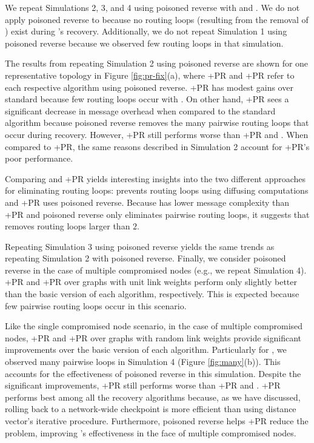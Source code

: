 We repeat Simulations 2, 3, and 4 using poisoned reverse with \second and \cprs.  
We do not apply poisoned reverse to \purge because no routing loops (resulting from the removal of \bads)
exist during \purges's recovery. Additionally, we do not repeat Simulation 1 using poisoned reverse because we observed few routing loops in that simulation. 

The results from repeating Simulation 2 using poisoned reverse are shown for one representative topology in Figure \ref{fig:pr-fix}(a),
where \seconds+{\textsc PR} and \cprs+{\textsc PR} refer to each respective algorithm
using poisoned reverse. 
\cprs+{\textsc PR} has modest gains over standard \cpr because few routing loops occur with \cprs. On other hand,
\seconds+{\textsc PR} sees a significant decrease in message overhead when compared to the standard \second algorithm because poisoned reverse removes the many pairwise routing 
loops that occur during \second recovery. However,  \seconds+{\textsc PR} still performs worse than \cprs+{\textsc PR} and \purges.  When compared to \cprs+{\textsc PR}, 
the same reasons described in Simulation 2 account for \seconds+{\textsc PR}'s poor performance. %

Comparing \purge and \seconds+{\textsc PR} yields interesting insights into the two different approaches for eliminating routing loops: \purge prevents routing loops using diffusing computations
and \seconds+{\textsc PR} uses poisoned reverse.
Because \purge has lower message complexity than \seconds+{\textsc PR} and poisoned reverse only eliminates pairwise routing loops, 
it suggests that \purge removes routing loops larger than $2$.  %

Repeating Simulation 3 using poisoned reverse yields the same trends as repeating Simulation 2 with poisoned reverse.  Finally, we consider poisoned reverse in the case 
of multiple compromised nodes (e.g., we repeat Simulation 4). \seconds+{\textsc PR} and \cprs+{\textsc PR} over \er graphs with unit link weights perform only slightly 
better than the basic version of each algorithm, respectively.  This is expected because few pairwise routing loops occur in this scenario.  

Like the single compromised node scenario, in the case of multiple compromised nodes, \seconds+{\textsc PR} and \cprs+{\textsc PR} over \er graphs with random link weights provide 
significant improvements over the basic version of each algorithm.  Particularly for \seconds, we observed many pairwise loops in Simulation 4 (Figure \ref{fig:many}(b)). This 
accounts for the effectiveness of poisoned reverse in this simulation.  Despite the significant improvements, \seconds+{\textsc PR} still performs worse than \cprs+{\textsc PR} and \purges. 
\cprs+{\textsc PR} performs best among all the recovery algorithms because, as we have discussed, rolling back to a network-wide checkpoint is more efficient than using distance vector's
iterative procedure. Furthermore, poisoned reverse helps \cprs+{\textsc PR} reduce the \infinity problem, improving \cprs's effectiveness in the face of multiple 
compromised nodes. 


